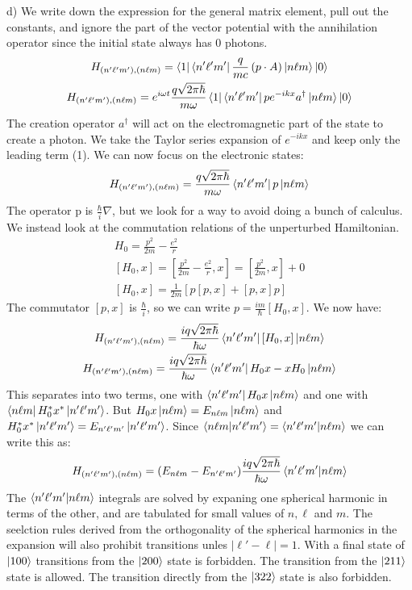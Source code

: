 \documentclass[a4paper,11pt]{article}
\numberwithin{equation}{section}
\begin{document}
d) We write down the expression for the general matrix element, pull out the constants, and ignore the part of the vector potential with the annihilation operator since the initial state always has 0 photons.
\begin{gather}
 H_{(n'\ell 'm'),(n\ell m)}=\bra{1}\bra{n'\ell 'm'}\frac{q}{mc}\left(p\cdot A\right)\ket{n\ell m}\ket{0}\\
 H_{(n'\ell 'm'),(n\ell m)}= e^{i\omega t}\frac{q\sqrt{2\pi\hbar}}{m \omega}\bra{1}\bra{n'\ell 'm'}pe^{-ikx}a^{\dagger}\ket{n\ell m}\ket{0}
\end{gather}
The creation operator $a^{\dagger}$ will act on the electromagnetic part of the state to create a photon.
We take the Taylor series expansion of $e^{-ikx}$ and keep only the leading term (1). 
We can now focus on the electronic states:
\begin{gather}
 H_{(n'\ell 'm'),(n\ell m)}= \frac{q\sqrt{2\pi\hbar}}{m \omega}\bra{n'\ell 'm'}p\ket{n\ell m}
\end{gather}
The operator p is $\frac{\hbar}{i}\nabla$, but we look for a way to avoid doing a bunch of calculus.
We instead look at the commutation relations of the unperturbed Hamiltonian.
\begin{gather}
 H_0 = \frac{p^2}{2m}-\frac{e^2}{r}\\
 [H_0,x] = [\frac{p^2}{2m}-\frac{e^2}{r}, x] = [\frac{p^2}{2m}, x]+0\\
 [H_0,x] = \frac{1}{2m}\left[p[p,x]+[p,x]p \right]
\end{gather}
The commutator $[p,x]$ is $\frac{\hbar}{i}$, so we can write $p=\frac{im}{\hbar}[H_0,x]$.
We now have:
\begin{gather}
 H_{(n'\ell 'm'),(n\ell m)}=\frac{iq\sqrt{2\pi\hbar}}{\hbar \omega}\bra{n'\ell 'm'}[H_0,x]\ket{n\ell m}\\
 H_{(n'\ell 'm'),(n\ell m)}=\frac{iq\sqrt{2\pi\hbar}}{\hbar \omega}\bra{n'\ell 'm'}H_0x-xH_0\ket{n\ell m}\\
\end{gather}
This separates into two terms, one with $\bra{n'\ell 'm'}H_0x\ket{n\ell m}$ and one with $\bra{n \ell m}H_0^*x^*\ket{n'\ell ' m'}$.
But $H_0x\ket{n\ell m}=E_{n\ell m}\ket{n\ell m}$ and $H_0^*x^*\ket{n'\ell ' m'}=E_{n'\ell 'm'}\ket{n'\ell ' m'}$.
Since $\braket{n\ell m|n' \ell' m'}=\braket{n'\ell 'm'|n\ell m}$ we can write this as:
\begin{gather}
  H_{(n'\ell 'm'),(n\ell m)}=(E_{n\ell m}-E_{n'\ell 'm'})
	  \frac{iq\sqrt{2\pi\hbar}}{\hbar \omega}
	  \braket{n'\ell 'm'|n\ell m}
\end{gather}
The $\braket{n'\ell 'm'|n\ell m}$ integrals are solved by expaning one spherical harmonic in terms of the other, and are tabulated for small values of $n, \ell$ and $m$.
The seelction rules derived from the orthogonality of the spherical harmonics in the expansion will also prohibit transitions unles $|\ell'-\ell|=1$.
With a final state of $\ket{100}$ transitions from the $\ket{200}$ state is forbidden. The transition from the $\ket{211}$ state is allowed. 
The transition directly from the $\ket{322}$ state is also forbidden.
\end{document}

